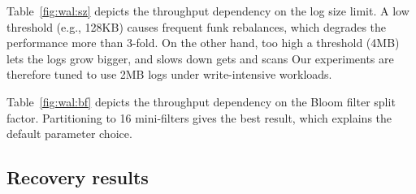Table~\ref{fig:wal:sz} depicts the throughput dependency on the log size limit. A low threshold (e.g., 128KB) 
causes frequent funk rebalances, which degrades the performance more than 3-fold. On the other hand, too high a threshold (4MB) 
lets the logs grow bigger, and slows down gets and scans Our experiments are therefore tuned to use 2MB logs under write-intensive 
workloads.

Table~\ref{fig:wal:bf} depicts the throughput dependency on the Bloom filter split factor. 
Partitioning to 16 mini-filters gives the best result, which explains the default parameter choice. 



\subsection{Recovery results}
\label{ssec:recover} 
